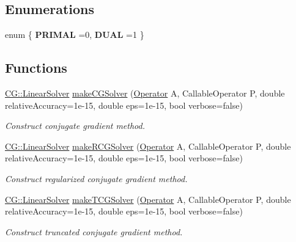 \subsection*{Enumerations}
\begin{DoxyCompactItemize}
\item 
\hypertarget{group__ProductSpaceGroup_gaf65a00de69cbc808db7cddb728796894}{}enum \{ {\bfseries P\+R\+I\+M\+A\+L} =0, 
{\bfseries D\+U\+A\+L} =1
 \}\label{group__ProductSpaceGroup_gaf65a00de69cbc808db7cddb728796894}

\end{DoxyCompactItemize}
\subsection*{Functions}
\begin{DoxyCompactItemize}
\item 
\hyperlink{classSpacy_1_1CG_1_1LinearSolver}{C\+G\+::\+Linear\+Solver} \hyperlink{namespaceSpacy_aafd9bf87164dd48991d2016aec8bad08}{make\+C\+G\+Solver} (\hyperlink{classSpacy_1_1Operator}{Operator} A, Callable\+Operator P, double relative\+Accuracy=1e-\/15, double eps=1e-\/15, bool verbose=false)
\begin{DoxyCompactList}\small\item\em Construct conjugate gradient method. \end{DoxyCompactList}\item 
\hyperlink{classSpacy_1_1CG_1_1LinearSolver}{C\+G\+::\+Linear\+Solver} \hyperlink{namespaceSpacy_af9ddae62858412fe5309d11aac7b8ed3}{make\+R\+C\+G\+Solver} (\hyperlink{classSpacy_1_1Operator}{Operator} A, Callable\+Operator P, double relative\+Accuracy=1e-\/15, double eps=1e-\/15, bool verbose=false)
\begin{DoxyCompactList}\small\item\em Construct regularized conjugate gradient method. \end{DoxyCompactList}\item 
\hyperlink{classSpacy_1_1CG_1_1LinearSolver}{C\+G\+::\+Linear\+Solver} \hyperlink{namespaceSpacy_a5693f62a60708a49f51cf451991b96ec}{make\+T\+C\+G\+Solver} (\hyperlink{classSpacy_1_1Operator}{Operator} A, Callable\+Operator P, double relative\+Accuracy=1e-\/15, double eps=1e-\/15, bool verbose=false)
\begin{DoxyCompactList}\small\item\em Construct truncated conjugate gradient method. \end{DoxyCompactList}\item 

\end{DoxyCompactItemize}

